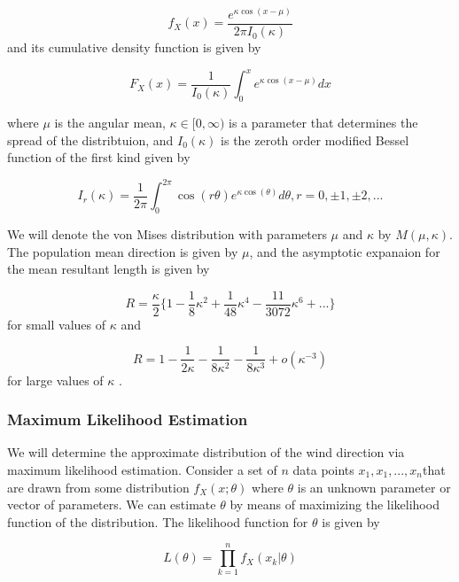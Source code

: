 \documentclass[12pt]{article}
\numberwithin{equation}{section}
\numberwithin{figure}{section}
\begin{document}
\begin{equation}\label{eq:vm}
f_{X}(x) = \frac{e^{\kappa \cos(x - \mu)}}{2\pi I_0(\kappa)}
\end{equation}
and its cumulative density function is given by \cite{Kanti}

\begin{equation}\label{eq:vmcdf}
F_X(x) = \frac{1}{I_0(\kappa)}\int_0^x e^{\kappa \cos(x-\mu)}dx
\end{equation}

where $\mu$ is the angular mean, $\kappa \in [0,\infty)$ is a parameter that determines the spread of the distribtuion, and $I_0(\kappa)$ is the zeroth order modified Bessel function of the first kind given by 

\begin{equation}\label{eq:I0}
I_r(\kappa) = \frac{1}{2\pi} \int_0^{2\pi}\cos( r \theta )e^{\kappa\cos(\theta )} d\theta, r = 0,\pm 1, \pm 2,...
\end{equation}

We will denote the von Mises distribution with parameters $\mu$ and $\kappa$ by $M(\mu, \kappa)$. The population mean direction is given by $\mu$, and the asymptotic expanaion for the mean resultant length is given by 

\begin{equation}\label{eq:smallkappa}
R = \frac{\kappa}{2}\{ 1-\frac{1}{8}\kappa^2+\frac{1}{48}\kappa^4-\frac{11}{3072}\kappa^6+... \}
\end{equation}
for small values of $\kappa$ and 

\begin{equation}\label{eq:largekappa}
R = 1-\frac{1}{2\kappa}-\frac{1}{8\kappa^2}-\frac{1}{8\kappa^3}+o(\kappa^{-3})
\end{equation}
for large values of $\kappa$ \cite{Kanti}.
\subsubsection{Maximum Likelihood Estimation}

We will determine the approximate distribution of the wind direction via maximum likelihood estimation. Consider a set of $n$ data points $ x_1, x_1, ...,x_n $that are drawn from some distribution $f_X(x;\theta)$ where $\theta$ is an unknown parameter or vector of parameters. We can estimate $\theta$ by means of maximizing the likelihood function of the distribution. The likelihood function for $\theta$ is given by

\begin{equation}\label{eq:likelihood fn}
L(\theta) = \prod_{k=1}^n f_X(x_k|\theta)
\end{equation}
\end{document}
